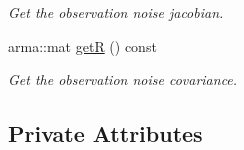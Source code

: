 \begin{DoxyCompactItemize}
\begin{DoxyCompactList}\small\item\em \-Get the observation noise jacobian. \end{DoxyCompactList}\item 
\hypertarget{class_linear_system_aaad4f742dcb61f776d5de952977a745e}{arma\-::mat \hyperlink{class_linear_system_aaad4f742dcb61f776d5de952977a745e}{get\-R} () const }\label{class_linear_system_aaad4f742dcb61f776d5de952977a745e}

\begin{DoxyCompactList}\small\item\em \-Get the observation noise covariance. \end{DoxyCompactList}\end{DoxyCompactItemize}
\subsection*{\-Private \-Attributes}
